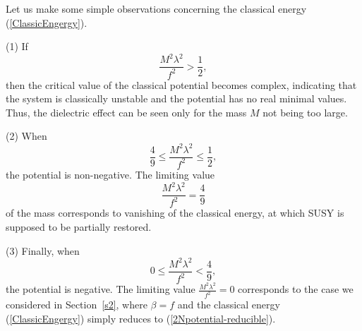 \documentclass[a4paper,12pt]{article}
\begin{document}
{Let us make some simple observations concerning the classical energy (\ref{ClassicEngergy}).

(1) If 
\begin{equation}
\frac{M^{2}\lambda^{2}}{f^{2}}>\frac{1}{2},
\end{equation}
then the critical value of the classical potential becomes complex, indicating that the system is classically unstable and the potential has no real minimal values. Thus, the dielectric effect can be seen only for the mass $M$ not being too large.

(2) When
\begin{equation}
\frac{4}{9}\leq\frac{M^{2}\lambda^{2}}{f^{2}}\leq\frac{1}{2},
\end{equation}
the potential is non-negative. The limiting value 
\begin{equation}
\frac{M^{2}\lambda^{2}}{f^{2}}=\frac{4}{9}
\label{SUSY}
\end{equation}
of the mass corresponds to vanishing of the classical energy, at which SUSY is supposed to be partially restored.

(3) Finally, when
\begin{equation}
0\leq \frac{M^{2}\lambda^{2}}{f^{2}} < \frac{4}{9},
\end{equation}
the potential is negative. The limiting value $\frac{M^{2}\lambda^{2}}{f^{2}}=0$ corresponds to the case we considered in Section~\ref{s2}, where $\beta=f$ and the classical energy (\ref{ClassicEngergy}) simply reduces to (\ref{2Npotential-reducible}).

}
\end{document}
